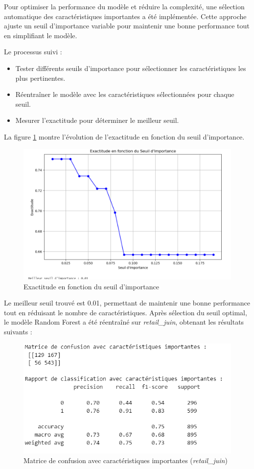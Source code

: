 Pour optimiser la performance du modèle et réduire la complexité, une sélection automatique des caractéristiques importantes a été implémentée. Cette approche ajuste un seuil d'importance variable pour maintenir une bonne performance tout en simplifiant le modèle.

Le processus suivi :
\begin{itemize}
    \item Tester différents seuils d'importance pour sélectionner les caractéristiques les plus pertinentes.
    \item Réentraîner le modèle avec les caractéristiques sélectionnées pour chaque seuil.
    \item Mesurer l'exactitude pour déterminer le meilleur seuil.
\end{itemize}

La figure \ref{fig:seuil_importance} montre l'évolution de l'exactitude en fonction du seuil d'importance.

\begin{figure}[H]
    \centering
    \includegraphics[width=0.5\linewidth]{capture_modele_38.png}
    \caption{Exactitude en fonction du seuil d'importance}
    \label{fig:seuil_importance}
\end{figure}

Le meilleur seuil trouvé est 0.01, permettant de maintenir une bonne performance tout en réduisant le nombre de caractéristiques. Après sélection du seuil optimal, le modèle Random Forest a été réentraîné sur \textit{retail\_juin}, obtenant les résultats suivants :

\begin{figure}[H]
    \centering
    \includegraphics[width=0.6\linewidth]{capture_modele_39.png}
    \caption{Matrice de confusion avec caractéristiques importantes (\textit{retail\_juin})}
    \label{fig:confusion_rf_imp}
\end{figure}


